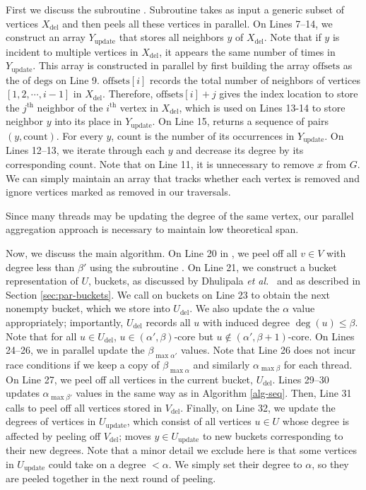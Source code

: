 First we discuss the subroutine . Subroutine  takes as input a generic subset of vertices $X_\text{del}$ and then peels all these vertices in parallel. On Lines 7--14, we construct an array $Y_\text{update}$ that stores all neighbors $y$ of $X_\text{del}$. Note that if $y$ is incident to multiple vertices in $X_\text{del}$, it appears the same number of times in $Y_\text{update}$. This array is constructed in parallel by first building the array $\text{offsets}$ as the  of $\text{degs}$ on Line 9. $\text{offsets}[i]$ records the total number of neighbors of vertices $[1,2,\cdots,i-1]$ in $X_\text{del}$. Therefore, $\text{offsets}[i]+j$ gives the index location to store the $j^\text{th}$ neighbor of the $i^\text{th}$ vertex in $X_\text{del}$, which is used on Lines 13-14 to store neighbor $y$ into its place in $Y_\text{update}$. On Line 15,  returns a sequence of pairs $(y,\text{count})$. For every $y$, $\text{count}$ is the number of its occurrences in $Y_\text{update}$. On Lines 12--13, we iterate through each $y$ and decrease its degree by its corresponding $\text{count}$. Note that on Line 11, it is unnecessary to remove $x$ from $G$. We can simply maintain an array that tracks whether each vertex is removed and ignore vertices marked as removed in our traversals. 

Since many threads may be updating the degree of the same vertex, our parallel aggregation approach is necessary to maintain low theoretical span.

Now, we discuss the main algorithm. 
On Line 20 in , we peel off all $v\in V$ with degree less than $\beta'$ using the subroutine . On Line 21, we construct a bucket representation of $U$, buckets, as discussed by Dhulipala \textit{et al.}~\cite{DhBlSh17} and as described in Section \ref{sec:par-buckets}. We call  on $\text{buckets}$ on Line 23 to obtain the next nonempty bucket, which we store into $U_\text{del}$. We also update the $\alpha$ value appropriately; importantly, $U_\text{del}$ records all $u$ with induced degree $\deg(u)\le \beta$. Note that for all $u\in U_\text{del}$, $u\in (\alpha',\beta)$-core but $u\not\in (\alpha',\beta+1)$-core. On Lines 24--26, we in parallel update the $\beta_{\max \alpha'}$ values. Note that Line 26 does not incur race conditions if we keep a copy of $\beta_{\max \alpha}$ and similarly $\alpha_{\max \beta}$ for each thread. 
On Line 27, we peel off all vertices in the current bucket, $U_\text{del}$. Lines 29--30 updates $\alpha_{\max \beta'}$ values in the same way as in Algorithm \ref{alg-seq}. Then, Line 31 calls  to peel off all vertices stored in $V_\text{del}$. Finally, on Line 32, we update the degrees of vertices in $U_\text{update}$, which consist of all vertices $u\in U$ whose degree is affected by peeling off $V_\text{del}$;  moves $y\in U_\text{update}$ to new buckets corresponding to their new degrees. Note that a minor detail we exclude here is that some vertices in $U_\text{update}$ could take on a degree $< \alpha$. We simply set their degree to $\alpha$, so they are peeled together in the next round of peeling.

